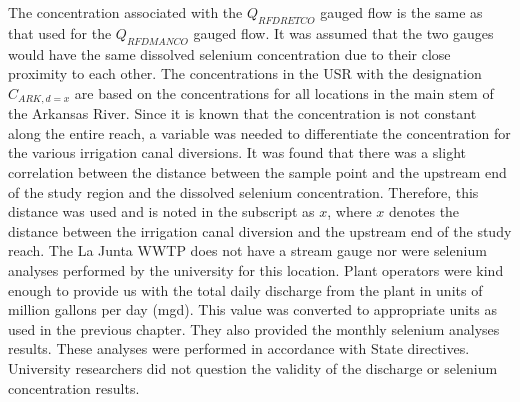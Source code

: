 \begin{linenumbers}
The concentration associated with the $ Q_{RFDRETCO} $ gauged flow is the same as that used for the $ Q_{RFDMANCO} $ gauged flow.  It was assumed that the two gauges would have the same dissolved selenium concentration due to their close proximity to each other.  The concentrations in the USR with the designation $ C_{ARK,d=x} $ are based on the concentrations for all locations in the main stem of the Arkansas River.  Since it is known that the concentration is not constant along the entire reach, a variable was needed to differentiate the concentration for the various irrigation canal diversions.  It was found that there was a slight correlation between the distance between the sample point and the upstream end of the study region and the dissolved selenium concentration.  Therefore, this distance was used and is noted in the subscript as $ x $, where $ x $ denotes the distance between the irrigation canal diversion and the upstream end of the study reach.  The La Junta WWTP does not have a stream gauge nor were selenium analyses performed by the university for this location.  Plant operators were kind enough to provide us with the total daily discharge from the plant in units of million gallons per day (mgd).  This value was converted to appropriate units as used in the previous chapter.  They also provided the monthly selenium analyses results.  These analyses were performed in accordance with State directives.  University researchers did not question the validity of the discharge or selenium concentration results.


\end{linenumbers}
